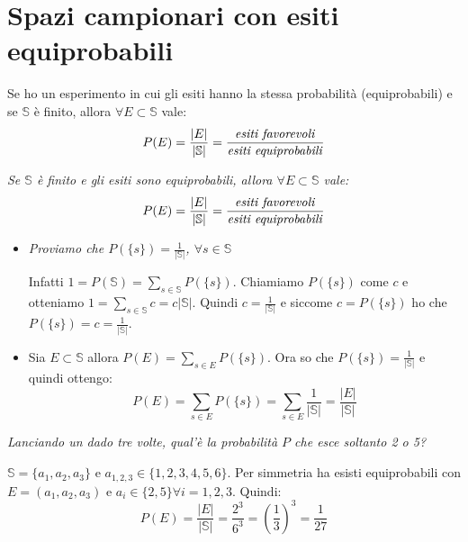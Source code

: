 \section{Spazi campionari con esiti equiprobabili}
Se ho un esperimento in cui gli esiti hanno la stessa probabilità (equiprobabili) e se $\mathbb{S}$ è finito, allora $\forall E\subset\mathbb{S}$ vale:
\begin{equation*}
    P(E)=\frac{|E|}{|\mathbb{S}|}=\frac{\mbox{\textit{esiti favorevoli}}}{\mbox{\textit{esiti equiprobabili}}}
\end{equation*}

\begin{Proposition}{}{}
    \textit{Se $\mathbb{S}$ è finito e gli esiti sono equiprobabili, allora $\forall E\subset\mathbb{S}$ vale:}
    \begin{equation*}
        P(E)=\frac{|E|}{|\mathbb{S}|}=\frac{\mbox{\textit{esiti favorevoli}}}{\mbox{\textit{esiti equiprobabili}}}
    \end{equation*}
\begin{demonstration}\phantom{}

\begin{itemize}
    \item \textit{Proviamo che $P(\{s\})=\frac{1}{|\mathbb{S}|}$, $\forall s\in\mathbb{S}$}

    Infatti $1=P(\mathbb{S})=\sum_{s\in\mathbb{S}}P(\{s\})$. Chiamiamo $P(\{s\})$ come $c$ e otteniamo $1=\sum_{s\in\mathbb{S}}c=c|\mathbb{S}|$. Quindi $c=\frac{1}{|\mathbb{S}|}$ e siccome $c=P(\{s\})$ ho che $P(\{s\})=c=\frac{1}{|\mathbb{S}|}$.
    \item Sia $E\subset\mathbb{S}$ allora $P(E)=\sum_{s\in E}P(\{s\})$. Ora so che $P(\{s\})=\frac{1}{|\mathbb{S}|}$ e quindi ottengo:
    \begin{equation*}
        P(E)=\sum_{s\in E}P(\{s\})=\sum_{s\in E}\frac{1}{|\mathbb{S}|}=\frac{|E|}{|\mathbb{S}|}
    \end{equation*}
\end{itemize}
\end{demonstration}
\end{Proposition}

\begin{Example}{}{}
    \textit{Lanciando un dado tre volte, qual'è la probabilità $P$ che esce soltanto 2 o 5?}
    
    $\mathbb{S}=\{a_1,a_2,a_3\}$ e $a_{1,2,3}\in\{1,2,3,4,5,6\}$. Per simmetria ha esisti equiprobabili con $E=(a_1,a_2,a_3)$ e $a_i\in\{2,5\}\forall i=1,2,3$. Quindi:
    \begin{equation*}
        P(E)=\frac{|E|}{|\mathbb{S}|}=\frac{2^3}{6^3}=(\frac{1}{3})^3=\frac{1}{27}
    \end{equation*}
\end{Example}

